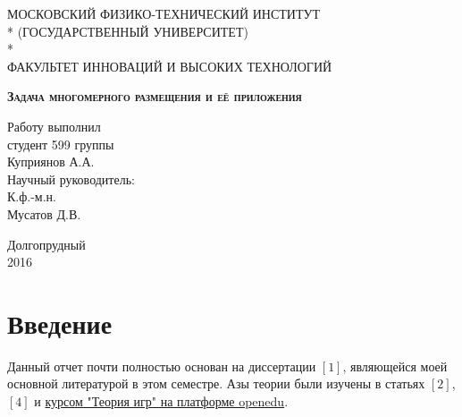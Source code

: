 \documentclass[a4paper,12pt]{article} %
\begin{document}
\begin{titlepage}
\newpage

\begin{center}
\vspace{2cm}
МОСКОВСКИЙ ФИЗИКО-ТЕХНИЧЕСКИЙ ИНСТИТУТ \\*
(ГОСУДАРСТВЕННЫЙ УНИВЕРСИТЕТ) \\*
\hrulefill \\ \vspace{0.3cm}
ФАКУЛЬТЕТ ИННОВАЦИЙ И ВЫСОКИХ ТЕХНОЛОГИЙ
\end{center}

\vspace{8em}

\vspace{2.5em}
 
\begin{center}
\Large{ \textsc{\textbf{Задача многомерного размещения и её приложения}} }
\end{center}

\vspace{5cm}
 
\begin{flushright}
Работу выполнил \\ студент 599 группы \\ Куприянов А.А. \\
\vspace{1.5em}
Научный руководитель: \\
К.ф.-м.н. \\ Мусатов Д.В.\\
\end{flushright}
 
\vspace{\fill}

\begin{center}
Долгопрудный \\ 2016
\end{center}

\end{titlepage}


\section{Введение}
Данный отчет почти полностью основан на диссертации $[1]$, являющейся моей основной литературой в этом семестре. Азы теории были изучены в статьях $[2]$, $[4]$ и \href{https://courses.openedu.ru/courses/course-v1:mipt+GAMETH+fall_2016/info}{ курсом "Теория игр" на платформе openedu}.
\end{document}
